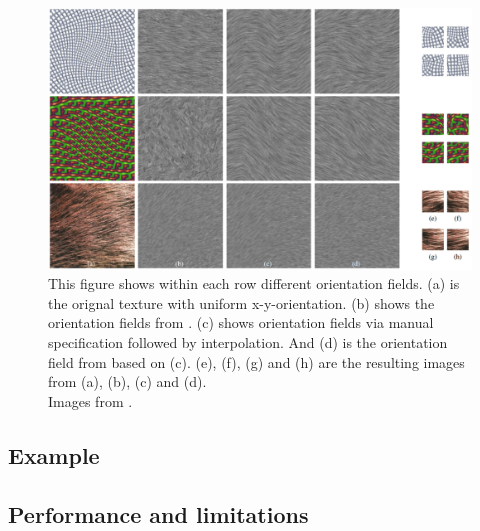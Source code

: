 \begin{figure}[h]
\centering
\includegraphics[scale=0.4]{img/orientationfield}
\caption[Orientation field]{This figure shows within each row different orientation fields. (a) is the orignal texture with uniform x-y-orientation. (b) shows the orientation fields from \cite{paris}. (c) shows orientation fields via manual specification followed by interpolation. And (d) is the orientation field from \cite{its} based on (c). (e), (f), (g) and (h) are the resulting images from (a), (b), (c) and (d).\\ Images from \cite{its}.}
\label{fig:Orientation field}
\end{figure}


\subsection{Example}
\subsection{Performance and limitations}
